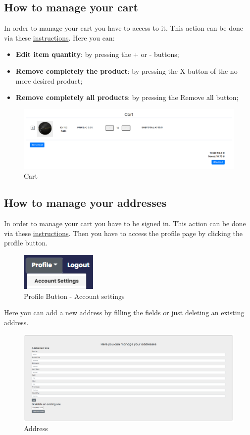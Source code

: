 \subsection{How to manage your cart} \label{_cart}
In order to manage your cart you have to access to it. This action can be done via these \hyperref[_checkcart]{instructions}.
Here you can:
\begin{itemize} 
    \item \textbf{Edit item quantity}: by pressing the + or - buttons;
    \item \textbf{Remove completely the product}: by pressing the X button of the no more desired product;
    \item \textbf{Remove completely all products}: by pressing the Remove all button;  
\end{itemize}
\begin{figure}[H]
    \centering
    \includegraphics[width=\linewidth]{res/images/cliente/cart.png}
    \caption{Cart}
\end{figure}

\subsection{How to manage your addresses} \label{_addresses}
In order to manage your cart you have to be signed in. This action can be done via these \hyperref[_signin]{instructions}.
Then you have to access the profile page by clicking the profile button.
\begin{figure}[H]
    \centering
    \includegraphics[width=10em]{res/images/cliente/profileaccount.png}
    \caption{Profile Button - Account settings}
\end{figure}

Here you can add a new address by filling the fields or just deleting an existing address. 
\begin{figure}[H]
    \centering
    \includegraphics[width=\linewidth]{res/images/cliente/address.png}
    \caption{Address}
\end{figure}
